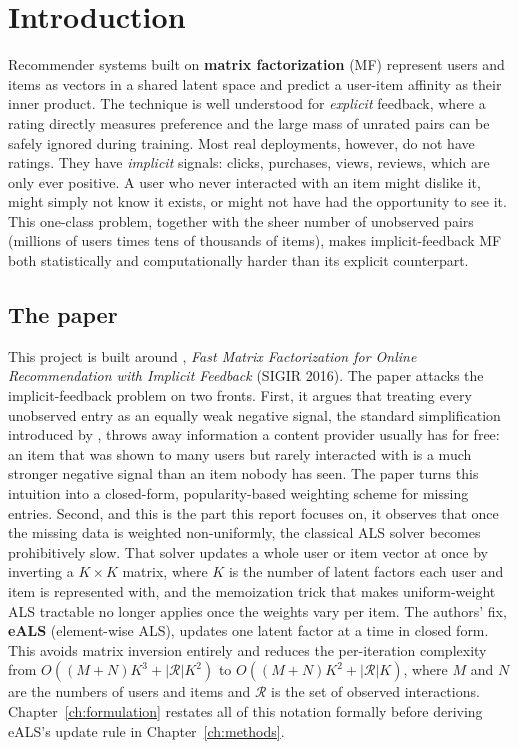 \chapter{Introduction}
\label{ch:intro}

Recommender systems built on \textbf{matrix factorization} (MF) represent
users and items as vectors in a shared latent space and predict a
user-item affinity as their inner product. The technique is well
understood for \emph{explicit} feedback, where a rating directly measures
preference and the large mass of unrated pairs can be safely ignored during
training. Most real deployments, however, do not have ratings. They have
\emph{implicit} signals: clicks, purchases, views, reviews, which are only
ever positive. A user who never interacted with an item might dislike it,
might simply not know it exists, or might not have had the opportunity to
see it. This one-class problem, together with the sheer number of
unobserved pairs (millions of users times tens of thousands of items),
makes implicit-feedback MF both statistically and computationally harder
than its explicit counterpart.

\section{The paper}

This project is built around \citet{he2016eals}, \emph{Fast Matrix
Factorization for Online Recommendation with Implicit Feedback} (SIGIR
2016). The paper attacks the implicit-feedback problem on two fronts.
First, it argues that treating every unobserved entry as an equally weak
negative signal, the standard simplification introduced by
\citet{hu2008implicit}, throws away information a content provider usually
has for free: an item that was shown to many users but rarely interacted
with is a much stronger negative signal than an item nobody has seen. The
paper turns this intuition into a closed-form, popularity-based weighting
scheme for missing entries. Second, and this is the part this report
focuses on, it observes that once the missing data is weighted
non-uniformly, the classical ALS solver becomes prohibitively slow. That
solver updates a whole user or item vector at once by inverting a
$K\times K$ matrix, where $K$ is the number of latent factors each user and
item is represented with, and the memoization trick that makes
uniform-weight ALS tractable no longer applies once the weights vary per
item. The authors' fix, \textbf{eALS} (element-wise ALS), updates one
latent factor at a time in closed form. This avoids matrix inversion
entirely and reduces the per-iteration complexity from
$O((M+N)K^3 + |\mathcal{R}|K^2)$ to $O((M+N)K^2+|\mathcal{R}|K)$, where $M$
and $N$ are the numbers of users and items and $\mathcal{R}$ is the set of
observed interactions. Chapter~\ref{ch:formulation} restates all of this
notation formally before deriving eALS's update rule in
Chapter~\ref{ch:methods}.

